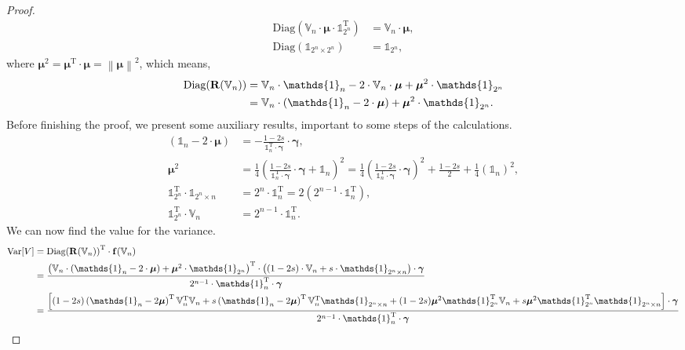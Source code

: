 \documentclass{article}
\newcommand{\0}{\mathbbold{0}}
\newcommand{\1}{\mathds{1}}
\newcommand{\2}{\mathbbold{2}}
\newcommand{\V}{\mathbb{V}}
\newcommand{\T}{^{\operatorname{T}}}
\newcommand{\Diag}[1]{\text{Diag}\!\left(#1\right)}
\begin{document}
\begin{proof}
\begin{align*}
        \Diag{\V_n\cdot{\boldsymbol \mu}\cdot\1_{2^n}\T} &= \V_n\cdot{\boldsymbol \mu}, \\
        \Diag{\1_{2^n \times 2^n}} &= \1_{2^n},
    \end{align*}
    where ${\boldsymbol \mu}^2 = {\boldsymbol \mu}\T\cdot {\boldsymbol \mu} = \left\lVert {\boldsymbol \mu}\right\rVert^2$, which means,
    \begin{align}
        \Diag{{\bf R}(\V_n)} &= \V_n\cdot\1_n - 2\cdot\V_n\cdot{\boldsymbol \mu} + {\boldsymbol \mu}^2\cdot\1_{2^n} \\
        &= \V_n\cdot\left(\1_n - 2\cdot{\boldsymbol \mu}\right) + {\boldsymbol \mu}^2\cdot\1_{2^n}.
    \end{align}
    Before finishing the proof, we present some auxiliary results, important to some steps of the calculations.
    \begin{align*}
        \left(\1_n - 2\cdot{\boldsymbol \mu}\right) &= -\frac{1-2s}{\1_n\T\cdot{\boldsymbol \gamma}}\cdot{\boldsymbol \gamma}, \\
        {\boldsymbol \mu}^2 &= \frac{1}{4}\left(\frac{1-2s}{\1_n\T\cdot {\boldsymbol \gamma}}\cdot {\boldsymbol \gamma} + \1_n\right)^2 = \frac{1}{4}\left(\frac{1-2s}{\1_n\T\cdot {\boldsymbol \gamma}}\cdot {\boldsymbol \gamma}\right)^2 + \frac{1-2s}{2} + \frac{1}{4}\left(\1_n\right)^2, \\
        \1_{2^n}\T\cdot\1_{2^n\times n} &= 2^n \cdot \1_n\T = 2\left(2^{n-1} \cdot \1_n\T \right), \\
        \1_{2^n}\T\cdot\V_n &= 2^{n-1} \cdot \1_n\T.
    \end{align*}
    We can now find the value for the variance.
    \begin{align*}
        \text{Var}[V] &= \Diag{{\bf R}(\V_n)}\T \cdot {\bf f}(\V_n) \\
        &= \frac{\left(\V_n\cdot\left(\1_n - 2\cdot{\boldsymbol \mu}\right) + {\boldsymbol \mu}^2\cdot\1_{2^n}\right)\T \cdot \left(\left(1-2s\right) \cdot \V_n + s\cdot\1_{2^n\times n}\right)\cdot {\boldsymbol \gamma}}{2^{n-1}\cdot \1_n\T \cdot {\boldsymbol \gamma}} \\
        &= \frac{\left[
            (1-2s)\left(\1_n - 2{\boldsymbol \mu}\right)\T\V_n\T\V_n
            + s\left(\1_n - 2{\boldsymbol \mu}\right)\T\V_n\T\1_{2^n\times n}
            + (1-2s){\boldsymbol \mu}^2\1_{2^n}\T\V_n
            + s{\boldsymbol \mu}^2\1_{2^n}\T\1_{2^n\times n}
        \right] \cdot {\boldsymbol \gamma} }{2^{n-1}\cdot \1_n\T \cdot {\boldsymbol \gamma}} \\

\end{align*}
\end{proof}
\end{document}
